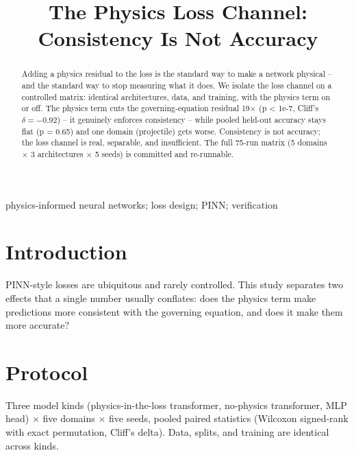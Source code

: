 \documentclass[conference,10pt]{IEEEtran}
\begin{document}
\title{The Physics Loss Channel: Consistency Is Not Accuracy}

\author{
}

\maketitle

\begin{abstract}
Adding a physics residual to the loss is the standard way to make a network physical -- and the standard way to stop measuring what it does. We isolate the loss channel on a controlled matrix: identical architectures, data, and training, with the physics term on or off. The physics term cuts the governing-equation residual 19$\times$ (p < 1e-7, Cliff's $\delta = -0.92$) -- it genuinely enforces consistency -- while pooled held-out accuracy stays flat (p = 0.65) and one domain (projectile) gets worse. Consistency is not accuracy; the loss channel is real, separable, and insufficient. The full 75-run matrix (5 domains $\times$ 3 architectures $\times$ 5 seeds) is committed and re-runnable.
\end{abstract}

\begin{IEEEkeywords}
physics-informed neural networks; loss design; PINN; verification
\end{IEEEkeywords}

\section{Introduction}
PINN-style losses are ubiquitous and rarely controlled. This study separates two effects that a single number usually conflates: does the physics term make predictions more consistent with the governing equation, and does it make them more accurate?

\section{Protocol}
Three model kinds (physics-in-the-loss transformer, no-physics transformer, MLP head) $\times$ five domains $\times$ five seeds, pooled paired statistics (Wilcoxon signed-rank with exact permutation, Cliff's delta). Data, splits, and training are identical across kinds.
\end{document}
